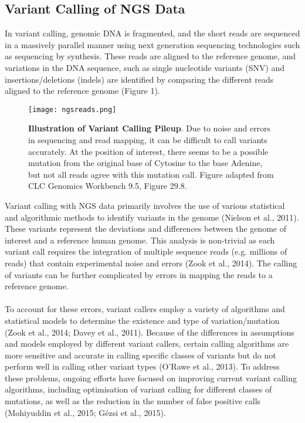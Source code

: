 \documentclass{article}
\begin{document}
\subsection{Variant Calling of NGS Data}
In variant calling, genomic DNA is fragmented, and the short reads are sequenced in a massively parallel manner using next generation sequencing technologies such as sequencing by synthesis. These reads are aligned to the reference genome, and variations in the DNA sequence, such as single nucleotide variants (SNV) and insertions/deletions (indels) are identified by comparing the different reads aligned to the reference genome (Figure 1).
\begin{figure}[H]
\texttt{[image: ngsreads.png]}
\centering
\caption{ \textbf{Illustration of Variant Calling Pileup}. Due to noise and errors in sequencing and read mapping, it can be difficult to call variants accurately. At the position of interest, there seems to be a possible mutation from the original base of Cytosine to the base Adenine, but not all reads agree with this mutation call. Figure adapted from CLC Genomics Workbench 9.5, Figure 29.8.}
\end{figure}
Variant calling with NGS data primarily involves the use of various statistical and algorithmic methods to identify variants in the genome (Nielson et al., 2011). These variants represent the deviations and differences between the genome of interest and a reference human genome. This analysis is non-trivial as each variant call requires the integration of multiple sequence reads (e.g. millions of reads) that contain experimental noise and errors (Zook et al., 2014). The calling of variants can be further complicated by errors in mapping the reads to a reference genome. \\\\ To account for these errors, variant callers employ a variety of algorithms and statistical models to determine the existence and type of variation/mutation (Zook et al., 2014; Davey et al., 2011). Because of the differences in assumptions and models employed by different variant callers, certain calling algorithms are more sensitive and accurate in calling specific classes of variants but do not perform well in calling other variant types (O'Rawe et al., 2013). To address these problems, ongoing efforts have focused on improving current variant calling algorithms, including optimisation of variant calling for different classes of mutations, as well as the reduction in the number of false positive calls (Mohiyuddin et al., 2015; Gézsi et al., 2015). 
\end{document}
